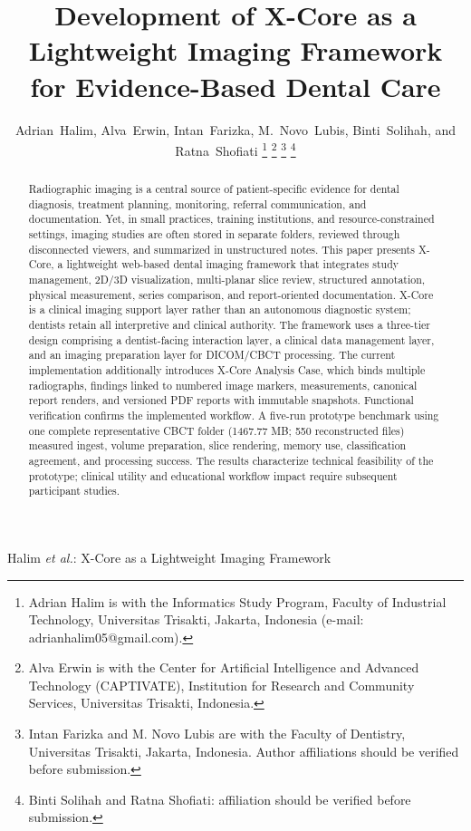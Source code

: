 \documentclass[journal]{IEEEtran}
\begin{document}
\title{Development of X-Core as a Lightweight Imaging Framework for Evidence-Based Dental Care}

\author{Adrian~Halim, Alva~Erwin, Intan~Farizka, M.~Novo~Lubis, Binti~Solihah, and Ratna~Shofiati%
\thanks{Adrian Halim is with the Informatics Study Program, Faculty of Industrial Technology, Universitas Trisakti, Jakarta, Indonesia (e-mail: adrianhalim05@gmail.com).}%
\thanks{Alva Erwin is with the Center for Artificial Intelligence and Advanced Technology (CAPTIVATE), Institution for Research and Community Services, Universitas Trisakti, Indonesia.}%
\thanks{Intan Farizka and M. Novo Lubis are with the Faculty of Dentistry, Universitas Trisakti, Jakarta, Indonesia. Author affiliations should be verified before submission.}%
\thanks{Binti Solihah and Ratna Shofiati: affiliation should be verified before submission.}}

%
{Halim \MakeLowercase{\textit{et al.}}: X-Core as a Lightweight Imaging Framework}
\maketitle

\begin{abstract}
Radiographic imaging is a central source of patient-specific evidence for dental diagnosis, treatment planning, monitoring, referral communication, and documentation. Yet, in small practices, training institutions, and resource-constrained settings, imaging studies are often stored in separate folders, reviewed through disconnected viewers, and summarized in unstructured notes. This paper presents X-Core, a lightweight web-based dental imaging framework that integrates study management, 2D/3D visualization, multi-planar slice review, structured annotation, physical measurement, series comparison, and report-oriented documentation. X-Core is a clinical imaging support layer rather than an autonomous diagnostic system; dentists retain all interpretive and clinical authority. The framework uses a three-tier design comprising a dentist-facing interaction layer, a clinical data management layer, and an imaging preparation layer for DICOM/CBCT processing. The current implementation additionally introduces X-Core Analysis Case, which binds multiple radiographs, findings linked to numbered image markers, measurements, canonical report renders, and versioned PDF reports with immutable snapshots. Functional verification confirms the implemented workflow. A five-run prototype benchmark using one complete representative CBCT folder (1467.77 MB; 550 reconstructed files) measured ingest, volume preparation, slice rendering, memory use, classification agreement, and processing success. The results characterize technical feasibility of the prototype; clinical utility and educational workflow impact require subsequent participant studies.
\end{abstract}
\end{document}
